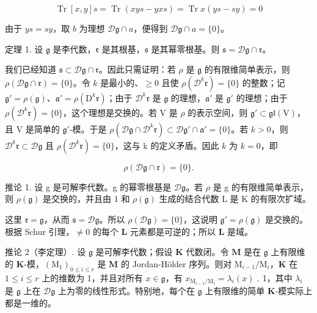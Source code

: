 \[
\operatorname{Tr} [ x, y ] s = \operatorname{Tr} (x y s - y x s) = \operatorname{Tr} x (y s - s y) = 0
\]

由于 \(ys = sy\)，取 \(b\) 为理想 \(\mathcal{D}\mathfrak{g} \cap a\)，便得到 \(\mathcal{D}\mathfrak{g} \cap a = \{0\}\)。

定理 1. 设 \(\mathfrak{g}\) 是李代数，\(\mathfrak{r}\) 是其根基，\(\mathfrak{s}\) 是其幂零根基。则 \(\mathfrak{s} = \mathcal{D}\mathfrak{g} \cap \mathfrak{r}\)。

我们已经知道 \(\mathfrak{s} \subset \mathcal{D}\mathfrak{g} \cap \mathfrak{r}\)。因此只需证明：若 \(\rho\) 是 \(\mathfrak{g}\) 的有限维简单表示，则 \(\rho(\mathcal{D}\mathfrak{g} \cap \mathfrak{r}) = \{0\}\)。令 \(k\) 是最小的、\(\geqslant 0\) 且使 \(\rho(\mathcal{D}^{k}\mathfrak{r}) = \{0\}\) 的整数；记 \(\mathfrak{g}' = \rho(\mathfrak{g})\)、\(\mathfrak{a}' = \rho(\mathrm{D}^k\mathfrak{r})\)；由于 \(\mathcal{D}^k\mathfrak{r}\) 是 \(\mathfrak{g}\) 的理想，\(\mathfrak{a}'\) 是 \(\mathfrak{g}'\) 的理想；由于 \(\rho(\mathcal{D}^{k}\mathfrak{r}) = \{0\}\)，这个理想是交换的。若 \(\mathrm{V}\) 是 \(\rho\) 的表示空间，则 \(\mathfrak{g}' \subset \mathfrak{gl}(\mathrm{V})\)，且 \(\mathrm{V}\) 是简单的 \(\mathfrak{g}'\)-模。于是 \(\rho(\mathcal{D}\mathfrak{g} \cap \mathcal{D}^k\mathfrak{r}) \subset \mathcal{D}\mathfrak{g}' \cap \mathfrak{a}' = \{0\}\)。若 \(k > 0\)，则 \(\mathcal{D}^k\mathfrak{r} \subset \mathcal{D}\mathfrak{g}\) 且 \(\rho(\mathcal{D}^k\mathfrak{r}) = \{0\}\)，这与 k 的定义矛盾。因此 \(k\) 为 \(k = 0\)，即

\[
\rho (\mathcal{D}\mathfrak{g} \cap \mathfrak{r}) = \{0 \}.
\]

推论 1. 设 g 是可解李代数。g 的幂零根基是 \(\mathcal{D}\mathfrak{g}\)。若 \(\rho\) 是 g 的有限维简单表示，则 \(\rho(\mathfrak{g})\) 是交换的，并且由 1 和 \(\rho(\mathfrak{g})\) 生成的结合代数 L 是 K 的有限次扩域。

这里 \(\mathfrak{r} = \mathfrak{g}\)，从而 \(\mathfrak{s} = \mathcal{D}\mathfrak{g}\)。所以 \(\rho(\mathcal{D}\mathfrak{g}) = \{0\}\)，这说明 \(\mathfrak{g}' = \rho(\mathfrak{g})\) 是交换的。根据 Schur 引理，\(\neq 0\) 的每个 \(\mathbf{L}\) 元素都是可逆的；所以 \(\mathbf{L}\) 是域。

推论 2（李定理）. 设 \(\mathfrak{g}\) 是可解李代数；假设 \(\mathbf{K}\) 代数闭。令 \(\mathbf{M}\) 是在 \(\mathfrak{g}\) 上有限维的 \(\mathbf{K}\)-模，\((\mathrm{M}_1)_{0 \leqslant i \leqslant r}\) 是 \(\mathbf{M}\) 的 Jordan-Hölder 序列。则对 \(\mathrm{M}_{i - 1} / \mathrm{M}_i\)，\(\mathbf{K}\) 在 \(1 \leqslant i \leqslant r\) 上的维数为 1，并且对所有 \(x \in \mathfrak{g}\)，有 \(x_{\mathrm{M}_{i - 1} / \mathrm{M}_i} = \lambda_i(x)\) . 1，其中 \(\lambda_i\) 是 \(\mathfrak{g}\) 上在 \(\mathcal{D}\mathfrak{g}\) 上为零的线性形式。特别地，每个在 \(\mathfrak{g}\) 上有限维的简单 \(\mathbf{K}\)-模实际上都是一维的。

